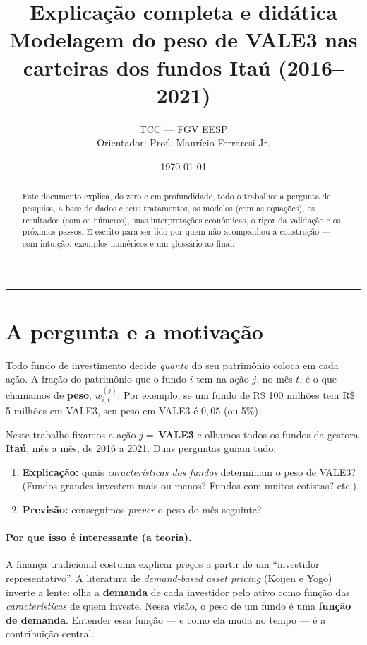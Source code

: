 \documentclass[11pt]{article}
\title{\textbf{Explicação completa e didática}\\[2pt]
\large Modelagem do peso de VALE3 nas carteiras dos fundos Itaú (2016--2021)}
\author{TCC --- FGV EESP \\ Orientador: Prof.\ Maurício Ferraresi Jr.}
\date{\today}
\begin{document}
\maketitle

\begin{abstract}
\noindent Este documento explica, do zero e em profundidade, todo o trabalho: a
pergunta de pesquisa, a base de dados e seus tratamentos, os modelos (com as
equações), os resultados (com os números), suas interpretações econômicas, o rigor
da validação e os próximos passos. É escrito para ser lido por quem não acompanhou a
construção --- com intuição, exemplos numéricos e um glossário ao final.
\end{abstract}

\tableofcontents
\bigskip\hrule\bigskip

\section{A pergunta e a motivação}

Todo fundo de investimento decide \emph{quanto} do seu patrimônio coloca em cada
ação. A fração do patrimônio que o fundo $i$ tem na ação $j$, no mês $t$, é o que
chamamos de \textbf{peso}, $w_{i,t}^{(j)}$. Por exemplo, se um fundo de R\$ 100
milhões tem R\$ 5 milhões em VALE3, seu peso em VALE3 é $0{,}05$ (ou 5\%).

Neste trabalho fixamos a ação $j=$\,\textbf{VALE3} e olhamos todos os fundos da
gestora \textbf{Itaú}, mês a mês, de 2016 a 2021. Duas perguntas guiam tudo:
\begin{enumerate}[noitemsep]
\item \textbf{Explicação:} quais \emph{características dos fundos} determinam o peso
de VALE3? (Fundos grandes investem mais ou menos? Fundos com muitos cotistas? etc.)
\item \textbf{Previsão:} conseguimos \emph{prever} o peso do mês seguinte?
\end{enumerate}

\paragraph{Por que isso é interessante (a teoria).} A finança tradicional costuma
explicar preços a partir de um ``investidor representativo''. A literatura de
\emph{demand-based asset pricing} (Koijen e Yogo) inverte a lente: olha a
\textbf{demanda} de cada investidor pelo ativo como função das \emph{características}
de quem investe. Nessa visão, o peso de um fundo é uma \textbf{função de demanda}.
Entender essa função --- e como ela muda no tempo --- é a contribuição central.
\end{document}
